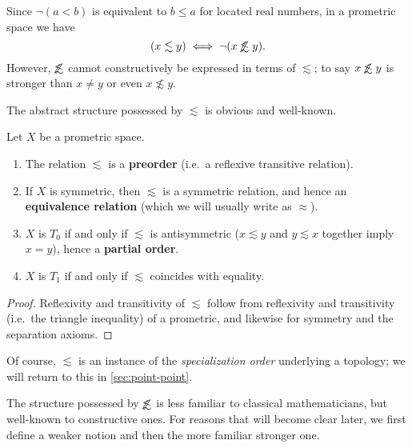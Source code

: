 \documentclass{article}
\def\oapt{\mathrel{\!\not\,\not\lesssim}}
\def\leapx{\lesssim}
\begin{document}
Since $\neg(a<b)$ is equivalent to $b\le a$ for located real numbers, in a prometric space we have
\begin{equation}
  (x\leapx y) \iff \neg(x\oapt y).\label{eq:leapx-oapt}
\end{equation}
However, $\oapt$ cannot constructively be expressed in terms of $\leapx$; to say $x\oapt y$ is stronger than $x\neq y$ or even $x\not\leapx y$.

The abstract structure possessed by $\leapx$ is obvious and well-known.

\begin{thm}\label{thm:pmet-preord}
  Let $X$ be a prometric space.
  \begin{enumerate}
  \item The relation $\leapx$ is a \textbf{preorder} (i.e.\ a reflexive transitive relation).
  \item If $X$ is symmetric, then $\leapx$ is a symmetric relation, and hence an \textbf{equivalence relation} (which we will usually write as $\approx$).
  \item $X$ is $T_0$ if and only if $\leapx$ is antisymmetric ($x\leapx y$ and $y\leapx x$ together imply $x=y$), hence a \textbf{partial order}.
  \item $X$ is $T_1$ if and only if $\leapx$ coincides with equality.
  \end{enumerate}
\end{thm}
\begin{proof}
  Reflexivity and transitivity of $\leapx$ follow from reflexivity and transitivity (i.e.\ the triangle inequality) of a prometric, and likewise for symmetry and the separation axioms.
\end{proof}

Of course, $\leapx$ is an instance of the \emph{specialization order} underlying a topology; we will return to this in \cref{sec:point-point}.

The structure possessed by $\oapt$ is less familiar to classical mathematicians, but well-known to constructive ones.  
For reasons that will become clear later, we first define a weaker notion and then the more familiar stronger one.
\end{document}
